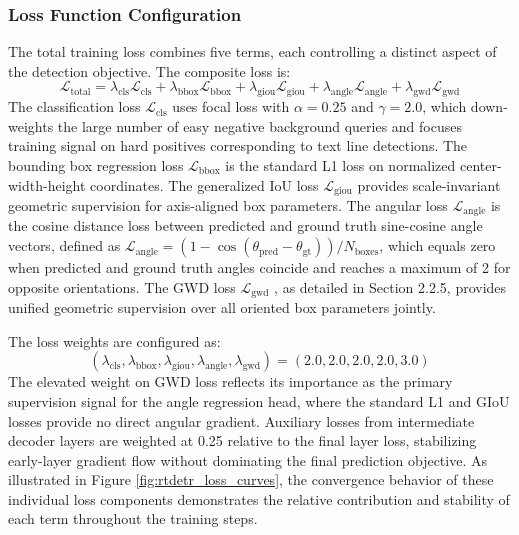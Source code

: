 \subsubsection{Loss Function Configuration}
The total training loss combines five terms, each controlling a distinct aspect of the detection objective. The composite loss is:
\begin{equation}
\mathcal{L}_{\text{total}} = \lambda_{\text{cls}} \mathcal{L}_{\text{cls}} + \lambda_{\text{bbox}} \mathcal{L}_{\text{bbox}} + \lambda_{\text{giou}} \mathcal{L}_{\text{giou}} + \lambda_{\text{angle}} \mathcal{L}_{\text{angle}} + \lambda_{\text{gwd}} \mathcal{L}_{\text{gwd}}
\end{equation}
The classification loss $\mathcal{L}_{\text{cls}}$ uses focal loss \cite{Lin2018} with $\alpha=0.25$ and $\gamma=2.0$, which down-weights the large number of easy negative background queries and focuses training signal on hard positives corresponding to text line detections. The bounding box regression loss $\mathcal{L}_{\text{bbox}}$ is the standard L1 loss on normalized center-width-height coordinates. The generalized IoU loss $\mathcal{L}_{\text{giou}}$ \cite{Rezatofighi2019} provides scale-invariant geometric supervision for axis-aligned box parameters. The angular loss $\mathcal{L}_{\text{angle}}$ is the cosine distance loss between predicted and ground truth sine-cosine angle vectors, defined as $\mathcal{L}_{\text{angle}} = (1 - \cos(\theta_{\text{pred}} - \theta_{\text{gt}})) / N_{\text{boxes}}$, which equals zero when predicted and ground truth angles coincide and reaches a maximum of 2 for opposite orientations. The GWD loss $\mathcal{L}_{\text{gwd}}$ \cite{Yang2022}, as detailed in Section 2.2.5, provides unified geometric supervision over all oriented box parameters jointly.

The loss weights are configured as:
\begin{equation}
(\lambda_{\text{cls}}, \lambda_{\text{bbox}}, \lambda_{\text{giou}}, \lambda_{\text{angle}}, \lambda_{\text{gwd}}) = (2.0, 2.0, 2.0, 2.0, 3.0)
\end{equation}
The elevated weight on GWD loss reflects its importance as the primary supervision signal for the angle regression head, where the standard L1 and GIoU losses provide no direct angular gradient. Auxiliary losses from intermediate decoder layers are weighted at 0.25 relative to the final layer loss, stabilizing early-layer gradient flow without dominating the final prediction objective. As illustrated in Figure \ref{fig:rtdetr_loss_curves}, the convergence behavior of these individual loss components demonstrates the relative contribution and stability of each term throughout the training steps.

